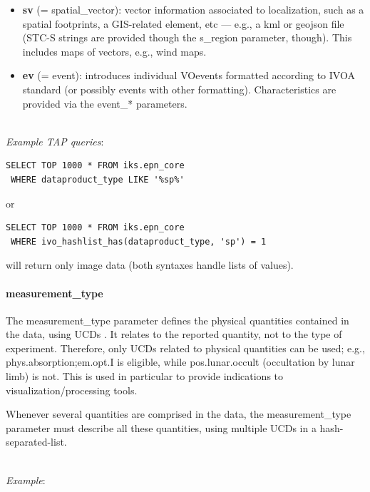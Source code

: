 \documentclass[11pt,a4paper]{ivoa}
\begin{document}
\begin{itemize}
\item \textbf{sv} (= spatial\_vector): vector information associated
to localization, such as a spatial footprints, a GIS-related element,
etc —  e.g., a kml or geojson file (STC-S strings are provided though
the s\_region parameter, though). This includes maps of vectors, e.g.,
wind maps.

\item \textbf{ev} (= event): introduces individual VOevents
formatted according to IVOA standard (or possibly events with other
formatting). Characteristics are provided via the event\_* parameters.

\end{itemize}

\textbf{\\}
\emph{Example TAP queries}:

\begin{verbatim}
SELECT TOP 1000 * FROM iks.epn_core
 WHERE dataproduct_type LIKE '%sp%'
\end{verbatim}

or

\begin{verbatim}
SELECT TOP 1000 * FROM iks.epn_core
 WHERE ivo_hashlist_has(dataproduct_type, 'sp') = 1
\end{verbatim}

will return only image data (both syntaxes handle lists of values).

\paragraph{measurement\_type}

The measurement\_type parameter defines the physical quantities
contained in the data, using UCDs \citep{2021ivoa.spec.0616C}. It relates to the reported quantity,
not to the type of experiment. Therefore, only UCDs related to physical
quantities can be used; e.g., phys.absorption;em.opt.I is eligible,
while pos.lunar.occult (occultation by lunar limb) is not. This is used in particular to provide
indications to visualization/processing tools.

Whenever several quantities are comprised in the data, the
measurement\_type parameter must describe all these quantities, using
multiple UCDs in a hash-separated-list.

\textbf{\\}
\emph{Example}:
\end{document}
